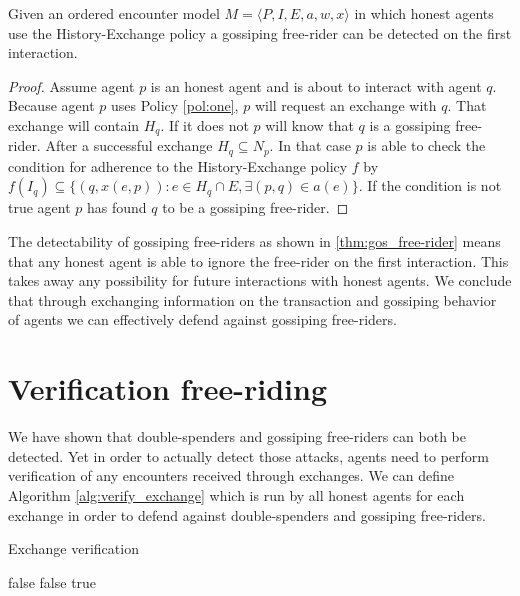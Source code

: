 \begin{thm}
    \label{thm:gos_free-rider}
    Given an ordered encounter model $M = \langle P, I, E, a, w, x \rangle$ in which honest agents use the History-Exchange policy
    a gossiping free-rider can be detected on the first interaction.
\end{thm}
\begin{proof}
    Assume agent $p$ is an honest agent and is about to interact with agent $q$. Because agent $p$
    uses Policy \ref{pol:one}, $p$ will request an exchange with $q$. That exchange will contain 
    $H_q$. If it does not $p$ will know that $q$ is a gossiping free-rider. After a successful
    exchange $H_q \subseteq N_p$. In that case $p$ is able to check the condition for adherence to 
    the History-Exchange policy $f$ by $f(I_q) \subseteq \{ (q, x(e, p)) : e \in 
    H_q \cap E, \exists (p, q) \in a(e)\}$. If the condition is not true agent $p$ has found $q$ to be a
    gossiping free-rider.
\end{proof}

The detectability of gossiping free-riders as shown in \ref{thm:gos_free-rider} means that any 
honest agent is able to ignore the free-rider on the first interaction. This takes away any 
possibility for future interactions with honest agents. We conclude that through exchanging
information on the transaction and gossiping behavior of agents we can effectively defend against 
gossiping free-riders.

\section{Verification free-riding}
We have shown that double-spenders and gossiping free-riders can both be detected. Yet in order to 
actually detect those attacks, agents need to perform verification of any encounters received 
through exchanges. We can define Algorithm \ref{alg:verify_exchange} which is run by all 
honest agents for each exchange in order to defend against double-spenders and gossiping free-riders.

\begin{algorithm}
\caption{Exchange verification}\label{alg:verify_exchange}
\begin{algorithmic}[1]
 \Return false
\EndIf
\EndFor
{}
 \Return false
\EndIf
\EndFor
\Return true
\EndProcedure
\end{algorithmic}
\end{algorithm}

